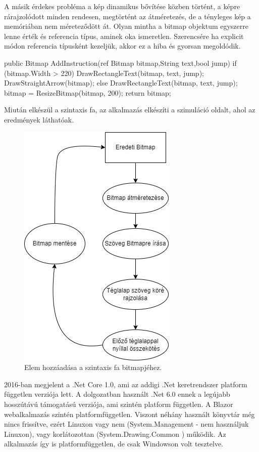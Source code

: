 A másik érdekes probléma a kép dinamikus bővítése közben történt, a képre rárajzolódott minden rendesen, megtörtént az átméretezés, de a tényleges kép a memóriában nem méreteződött át. Olyan mintha a bitmap objektum egyszerre lenne érték és referencia típus, aminek oka ismeretlen. Szerencsére ha explicit módon referencia típusként kezeljük, akkor ez a hiba és gyorsan megoldódik.

\begin{cpp}
public Bitmap AddInstruction(ref Bitmap bitmap,String text,bool jump)
{
      if (bitmap.Width > 220)
      {
           DrawRectangleText(bitmap, text, jump);
           DrawStraightArrow(bitmap);
       }
       else
       {
           DrawRectangleText(bitmap, text, jump);
       }
       bitmap = ResizeBitmap(bitmap, 200);
       return bitmap;
}
\end{cpp}

Miután elkészül a szintaxis fa, az alkalmazás elkészíti a szimuláció oldalt, ahol az eredmények láthatóak.

\begin{figure}[h]
\centering
\includegraphics[scale=0.7]{images/ST.jpg}
\caption{Elem hozzáadása a szintaxis fa bitmapjéhez.}
\label{fig:st}
\end{figure}

\newpage
{}
2016-ban megjelent a .Net Core 1.0, ami az addigi .Net keretrendszer platform független verziója lett. A dolgozatban használt .Net 6.0 ennek a legújabb hosszútávú támogatású verziója, ami szintén platform független. A Blazor webalkalmazás szintén platformfüggetlen. Viszont néhány használt könyvtár még nincs  frissítve, ezért Linuxon vagy nem (System.Management - nem használjuk Linuxon), vagy korlátozottan (System.Drawing.Common \cite{drawing})  működik. Az alkalmazás így is platformfüggetlen, de csak Windowson volt tesztelve.



